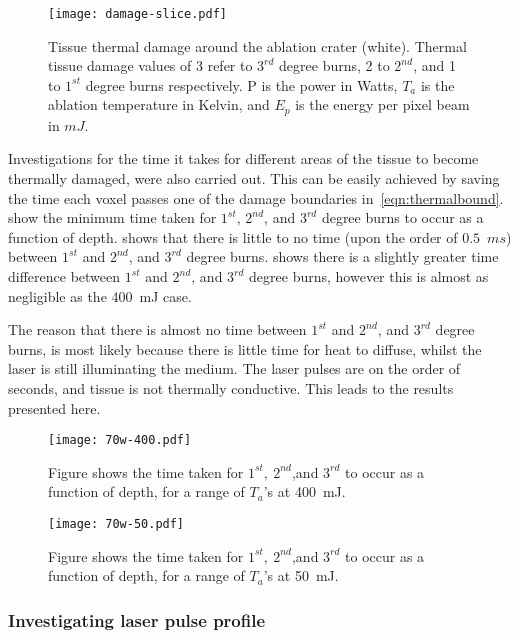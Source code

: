 \begin{figure}[!htbp]
	\centering
	\texttt{[image: damage-slice.pdf]}
	\caption{Tissue thermal damage around the ablation crater (white). Thermal tissue damage values of 3 refer to $3^{rd}$ degree burns, 2 to $2^{nd}$, and 1 to $1^{st}$ degree burns respectively. P is the power in Watts, $T_a$ is the ablation temperature in Kelvin, and $E_p$ is the energy per pixel beam in $mJ$.}
	\label{fig:damfig}
\end{figure}

Investigations for the time it takes for different areas of the tissue to become thermally damaged, were also carried out. This can be easily achieved by saving the time each voxel passes one of the damage boundaries in~\cref{eqn:thermalbound}.~ show the minimum time taken for $1^{st}$, $2^{nd}$, and $3^{rd}$ degree burns to occur as a function of depth.  shows that there is little to no time (upon the order of $0.5$~$ms$) between $1^{st}$ and $2^{nd}$, and $3^{rd}$ degree burns.
 shows there is a slightly greater time difference between $1^{st}$ and $2^{nd}$, and $3^{rd}$ degree burns, however this is almost as negligible as the 400~mJ case.

The reason that there is almost no time between $1^{st}$ and $2^{nd}$, and $3^{rd}$ degree burns, is most likely because there is little time for heat to diffuse, whilst the laser is still illuminating the medium. The laser pulses are on the order of seconds, and tissue is not thermally conductive. This leads to the results presented here.


\begin{figure}[!htbp]
	\centering
	\texttt{[image: 70w-400.pdf]}
	\caption{Figure shows the time taken for $1^{st},\ 2^{nd}$,and $3^{rd}$ to occur as a function of depth, for a range of $T_a$'s at 400~mJ.}
	\label{fig:time-thres1}
\end{figure}	
	\FloatBarrier

\begin{figure}[!htbp]

	\centering
	\texttt{[image: 70w-50.pdf]}
	\caption{Figure shows the time taken for $1^{st},\ 2^{nd}$,and $3^{rd}$ to occur as a function of depth, for a range of $T_a$'s at 50~mJ.}
	\label{fig:time-thres2}
\end{figure}	
\subsubsection*{Investigating laser pulse profile}

